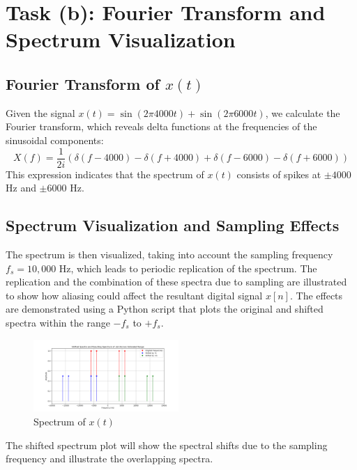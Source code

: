 
\item[(b)]
\section{Task (b): Fourier Transform and Spectrum Visualization}

\subsection{Fourier Transform of $x(t)$}
Given the signal $x(t) = \sin(2\pi 4000 t) + \sin(2\pi 6000 t)$, we calculate the Fourier transform, which reveals delta functions at the frequencies of the sinusoidal components:
$$
X(f) = \frac{1}{2i} \left(\delta(f - 4000) - \delta(f + 4000) + \delta(f - 6000) - \delta(f + 6000)\right)
$$
This expression indicates that the spectrum of $x(t)$ consists of spikes at $\pm 4000$ Hz and $\pm 6000$ Hz.

\subsection{Spectrum Visualization and Sampling Effects}
The spectrum is then visualized, taking into account the sampling frequency $f_s = 10,000$ Hz, which leads to periodic replication of the spectrum. The replication and the combination of these spectra due to sampling are illustrated to show how aliasing could affect the resultant digital signal $x[n]$. The effects are demonstrated using a Python script that plots the original and shifted spectra within the range $-f_s$ to $+f_s$.

\begin{figure}[h]
    \centering
    \includegraphics[width=0.49\textwidth]{fig/ex1_b_plot}
    \caption{Spectrum of \(x(t)\)}
    \label{fig:ex1_b_plot}
\end{figure}

The shifted spectrum plot will show the spectral shifts due to the sampling frequency and illustrate the overlapping spectra.